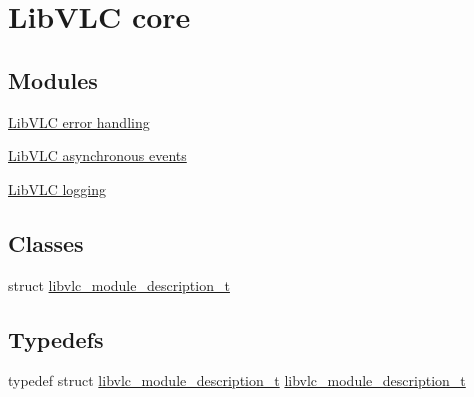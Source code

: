 \hypertarget{group__libvlc__core}{}\section{Lib\+V\+LC core}
\label{group__libvlc__core}
\subsection*{Modules}
\begin{DoxyCompactItemize}
\item 
\hyperlink{group__libvlc__error}{Lib\+V\+L\+C error handling}
\item 
\hyperlink{group__libvlc__event}{Lib\+V\+L\+C asynchronous events}
\item 
\hyperlink{group__libvlc__log}{Lib\+V\+L\+C logging}
\end{DoxyCompactItemize}
\subsection*{Classes}
\begin{DoxyCompactItemize}
\item 
struct \hyperlink{structlibvlc__module__description__t}{libvlc\+\_\+module\+\_\+description\+\_\+t}
\end{DoxyCompactItemize}
\subsection*{Typedefs}
\begin{DoxyCompactItemize}
\item 
typedef struct \hyperlink{structlibvlc__module__description__t}{libvlc\+\_\+module\+\_\+description\+\_\+t} \hyperlink{group__libvlc__core_ga22f982caec39eee2f7bcb853513c9ebe}{libvlc\+\_\+module\+\_\+description\+\_\+t}
\end{DoxyCompactItemize}
